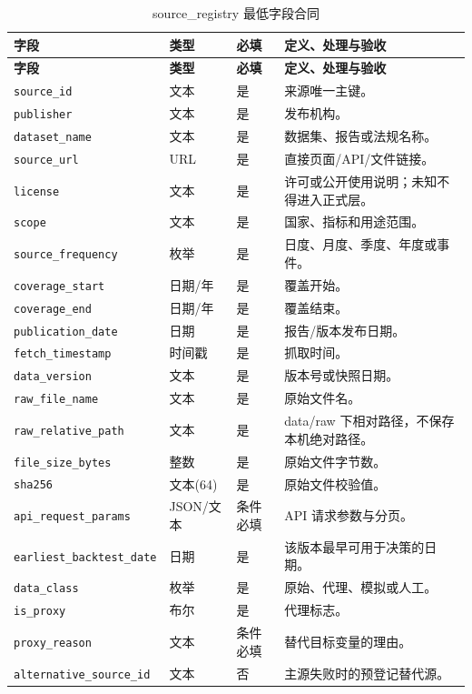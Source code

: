\documentclass[UTF8,fontset=windows,12pt,openany]{ctexbook}
\newcommand{\Field}[1]{{\small\nolinkurl{#1}}}
\begin{document}
\begin{longtable}{p{3.7cm}p{2.3cm}p{2.1cm}p{5.1cm}}
\caption{source\_registry 最低字段合同}\label{tab:dict-source}\\
\toprule
\textbf{字段} & \textbf{类型} & \textbf{必填} & \textbf{定义、处理与验收}\\
\midrule
\endfirsthead
\toprule \textbf{字段} & \textbf{类型} & \textbf{必填} & \textbf{定义、处理与验收}\\ \midrule
\endhead
\Field{source_id} & 文本 & 是 & 来源唯一主键。\\
\Field{publisher} & 文本 & 是 & 发布机构。\\
\Field{dataset_name} & 文本 & 是 & 数据集、报告或法规名称。\\
\Field{source_url} & URL & 是 & 直接页面/API/文件链接。\\
\Field{license} & 文本 & 是 & 许可或公开使用说明；未知不得进入正式层。\\
\Field{scope} & 文本 & 是 & 国家、指标和用途范围。\\
\Field{source_frequency} & 枚举 & 是 & 日度、月度、季度、年度或事件。\\
\Field{coverage_start} & 日期/年 & 是 & 覆盖开始。\\
\Field{coverage_end} & 日期/年 & 是 & 覆盖结束。\\
\Field{publication_date} & 日期 & 是 & 报告/版本发布日期。\\
\Field{fetch_timestamp} & 时间戳 & 是 & 抓取时间。\\
\Field{data_version} & 文本 & 是 & 版本号或快照日期。\\
\Field{raw_file_name} & 文本 & 是 & 原始文件名。\\
\Field{raw_relative_path} & 文本 & 是 & data/raw 下相对路径，不保存本机绝对路径。\\
\Field{file_size_bytes} & 整数 & 是 & 原始文件字节数。\\
\Field{sha256} & 文本(64) & 是 & 原始文件校验值。\\
\Field{api_request_params} & JSON/文本 & 条件必填 & API 请求参数与分页。\\
\Field{earliest_backtest_date} & 日期 & 是 & 该版本最早可用于决策的日期。\\
\Field{data_class} & 枚举 & 是 & 原始、代理、模拟或人工。\\
\Field{is_proxy} & 布尔 & 是 & 代理标志。\\
\Field{proxy_reason} & 文本 & 条件必填 & 替代目标变量的理由。\\
\Field{alternative_source_id} & 文本 & 否 & 主源失败时的预登记替代源。\\

\end{longtable}
\end{document}
